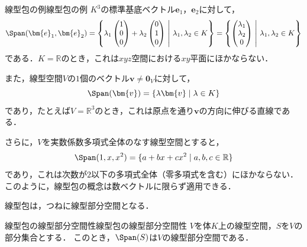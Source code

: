 \begin{example}{線型包の例}{線型包の例}
  $K^3$の標準基底ベクトル$\bm{e}_1$，$\bm{e}_2$に対して，
  \[
    \Span(\bm{e}_1, \bm{e}_2)
    = \left\{ \lambda_1 \begin{pmatrix} 1 \\ 0 \\ 0 \end{pmatrix} + \lambda_2 \begin{pmatrix} 0 \\ 1 \\ 0 \end{pmatrix} ~\middle|~ \lambda_1, \lambda_2 \in K \right\}
    = \left\{ \begin{pmatrix} \lambda_1 \\ \lambda_2 \\ 0 \end{pmatrix} ~\middle|~ \lambda_1, \lambda_2 \in K \right\}
  \]
  である．$K = \mathbb{R}$のとき，これは$xyz$空間における$xy$平面にほかならない．

  また，線型空間$V$の$1$個のベクトル$\bm{v} \neq \bm{0}_V$に対して，
  \[
    \Span(\bm{v}) = \{ \lambda \bm{v} \mid \lambda \in K \}
  \]
  であり，たとえば$V = \mathbb{R}^3$のとき，これは原点を通り$\bm{v}$の方向に伸びる直線である．

  さらに，$V$を実数係数多項式全体のなす線型空間とすると，
  \[
    \Span(1, x, x^2)
    = \{ a + bx + cx^2 \mid a, b, c \in \mathbb{R} \}
  \]
  であり，これは次数が$2$以下の多項式全体（零多項式を含む）にほかならない．
  このように，線型包の概念は数ベクトルに限らず適用できる．
\end{example}

線型包は，つねに線型部分空間となる．

\begin{prop}{線型包の線型部分空間性}{線型包の線型部分空間性}
  $V$を体$K$上の線型空間，$S$を$V$の部分集合とする．
  このとき，$\Span(S)$は$V$の線型部分空間である．
\end{prop}

